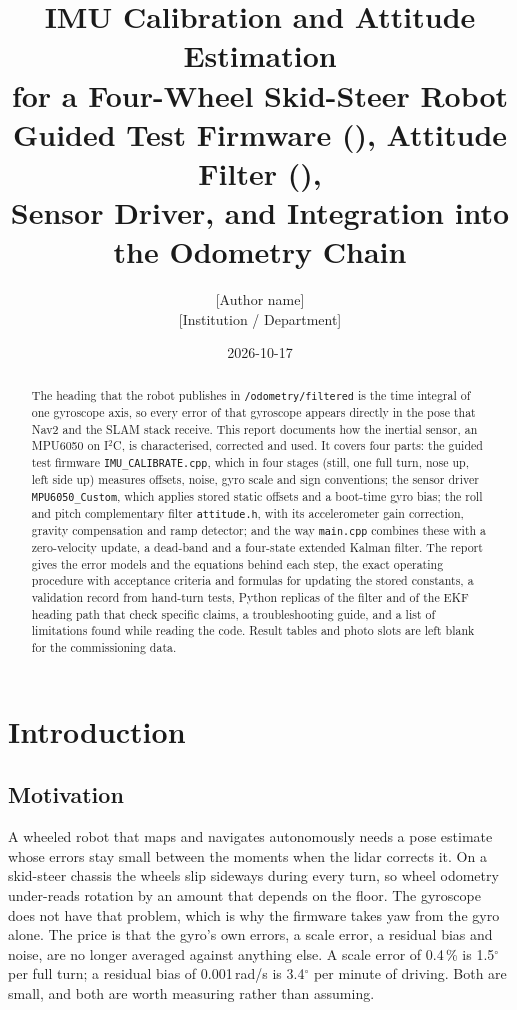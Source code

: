 \documentclass[11pt,a4paper]{report}
\title{\textbf{IMU Calibration and Attitude Estimation\\for a Four-Wheel Skid-Steer Robot}\\[6pt]
\large Guided Test Firmware (\code{IMU\_CALIBRATE.cpp}), Attitude Filter (\code{attitude.h}),\\Sensor Driver, and Integration into the Odometry Chain}
\author{[Author name]\\[0pt] {[Institution / Department]}}
\date{2026-10-17}
\newcommand{\code}[1]{\texttt{#1}}
\begin{document}
\maketitle

\begin{abstract}
The heading that the robot publishes in \code{/odometry/filtered} is the time integral of one gyroscope axis, so every error of that gyroscope appears directly in the pose that Nav2 and the SLAM stack receive. This report documents how the inertial sensor, an MPU6050 on I$^2$C, is characterised, corrected and used. It covers four parts: the guided test firmware \code{IMU\_CALIBRATE.cpp}, which in four stages (still, one full turn, nose up, left side up) measures offsets, noise, gyro scale and sign conventions; the sensor driver \code{MPU6050\_Custom}, which applies stored static offsets and a boot-time gyro bias; the roll and pitch complementary filter \code{attitude.h}, with its accelerometer gain correction, gravity compensation and ramp detector; and the way \code{main.cpp} combines these with a zero-velocity update, a dead-band and a four-state extended Kalman filter. The report gives the error models and the equations behind each step, the exact operating procedure with acceptance criteria and formulas for updating the stored constants, a validation record from hand-turn tests, Python replicas of the filter and of the EKF heading path that check specific claims, a troubleshooting guide, and a list of limitations found while reading the code. Result tables and photo slots are left blank for the commissioning data.
\end{abstract}

\tableofcontents
\listoffigures
\listoftables

\chapter{Introduction}

\section{Motivation}
A wheeled robot that maps and navigates autonomously needs a pose estimate whose errors stay small between the moments when the lidar corrects it. On a skid-steer chassis the wheels slip sideways during every turn, so wheel odometry under-reads rotation by an amount that depends on the floor. The gyroscope does not have that problem, which is why the firmware takes yaw from the gyro alone. The price is that the gyro's own errors, a scale error, a residual bias and noise, are no longer averaged against anything else. A scale error of 0.4\,\% is 1.5$^\circ$ per full turn; a residual bias of 0.001\,rad/s is 3.4$^\circ$ per minute of driving. Both are small, and both are worth measuring rather than assuming.
\end{document}

